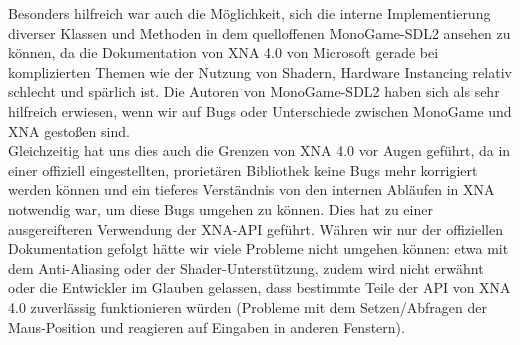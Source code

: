 Besonders hilfreich war auch die Möglichkeit, sich die interne Implementierung diverser Klassen und Methoden in dem quelloffenen MonoGame-SDL2 ansehen zu können, da die Dokumentation von XNA 4.0 von Microsoft gerade bei komplizierten Themen wie der Nutzung von Shadern, Hardware Instancing relativ schlecht und spärlich ist. Die Autoren von MonoGame-SDL2 haben sich als sehr hilfreich erwiesen, wenn wir auf Bugs oder Unterschiede zwischen MonoGame und XNA gestoßen sind.\\

Gleichzeitig hat uns dies auch die Grenzen von XNA 4.0 vor Augen geführt, da in einer offiziell eingestellten, prorietären Bibliothek keine Bugs mehr korrigiert werden können und ein tieferes Verständnis von den internen Abläufen in XNA notwendig war, um diese Bugs umgehen zu können. Dies hat zu einer ausgereifteren Verwendung der XNA-API geführt. Währen wir nur der offiziellen Dokumentation gefolgt hätte wir viele Probleme nicht umgehen können: etwa mit dem Anti-Aliasing oder der Shader-Unterstützung, zudem wird nicht erwähnt oder die Entwickler im Glauben gelassen, dass bestimmte Teile der API von XNA 4.0 zuverlässig funktionieren würden (Probleme mit dem Setzen/Abfragen der Maus-Position und reagieren auf Eingaben in anderen Fenstern).\\







